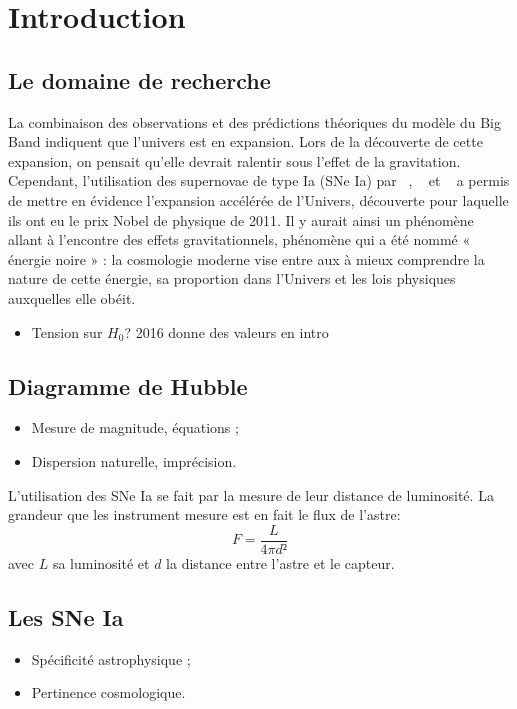 \documentclass[a4paper, 12pt, svgnames]{article}
\begin{document}
\tableofcontents
\newpage

\section{Introduction}\label{sec:int}
\subsection{Le domaine de recherche}

La combinaison des observations et des prédictions théoriques du modèle du Big
Band indiquent que l'univers est en expansion. Lors de la découverte de cette
expansion, on pensait qu'elle devrait ralentir sous l'effet de la gravitation.
Cependant, l'utilisation des supernovae de type Ia (SNe Ia) par ~\cite{perlmutter_measurements_1999}, 
~\cite{riess_observational_1998} et 
~\cite{schmidt_high-z_1998} a permis de mettre en évidence l'expansion
accélérée de l'Univers, découverte pour laquelle ils ont eu le prix Nobel de
physique de 2011. Il y aurait ainsi un phénomène allant à l'encontre des
effets gravitationnels, phénomène qui a été nommé « énergie noire » : la
cosmologie moderne vise entre aux à mieux comprendre la nature de cette énergie,
sa proportion dans l'Univers et les lois physiques auxquelles elle obéit.

\begin{itemize}
    \item Tension sur $H_0$?  2016 donne des valeurs en intro
\end{itemize}

\subsection{Diagramme de Hubble}
\begin{itemize}
    \item Mesure de magnitude, équations ;
    \item Dispersion naturelle, imprécision.
\end{itemize}
L'utilisation des SNe Ia se fait par la mesure de leur distance de luminosité.
La grandeur que les instrument mesure est en fait le flux de l'astre:
\[ F = \frac{L}{4\pi d²}\]
avec $L$ sa luminosité et $d$ la distance entre l'astre et le capteur.

\subsection{Les SNe Ia}
\begin{itemize}
    \item Spécificité astrophysique ;
    \item Pertinence cosmologique.
\end{itemize}
\end{document}
